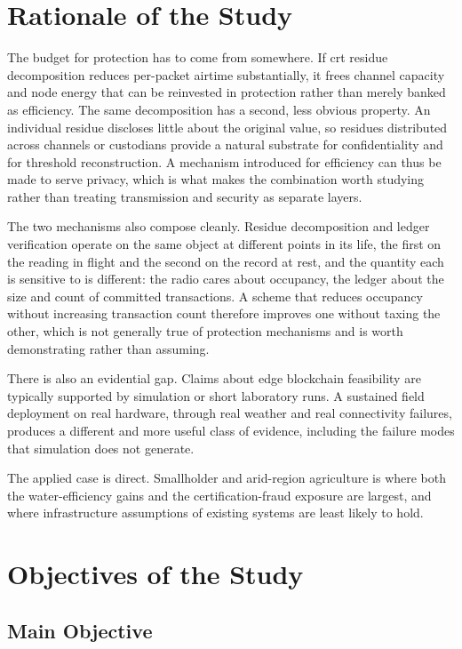 \documentclass[12pt,a4paper,oneside]{book}
\begin{document}
\section{Rationale of the Study}
\label{sec:rationale}

The budget for protection has to come from somewhere. If
\gls{crt} residue decomposition reduces per-packet airtime substantially, it
frees channel capacity and node energy that can be reinvested in protection
rather than merely banked as efficiency. The same decomposition has a second,
less obvious property. An individual residue discloses little about the original
value, so residues distributed across channels or custodians provide a natural
substrate for confidentiality and for threshold reconstruction. A mechanism
introduced for efficiency can thus be made to serve privacy, which is what makes
the combination worth studying rather than treating transmission and security as
separate layers.

The two mechanisms also compose cleanly. Residue
decomposition and ledger verification operate on the same object at different
points in its life, the first on the reading in flight and the second on the
record at rest, and the quantity each is sensitive to is different: the radio
cares about occupancy, the ledger about the size and count of committed
transactions. A scheme that reduces occupancy without increasing transaction
count therefore improves one without taxing the other, which is not generally
true of protection mechanisms and is worth demonstrating rather than assuming.

There is also an evidential gap. Claims about edge blockchain feasibility are
typically supported by simulation or short laboratory runs. A
sustained field deployment on real hardware, through real weather and real
connectivity failures, produces a different and more useful class of evidence,
including the failure modes that simulation does not generate.

The applied case is direct. Smallholder and arid-region agriculture is where
both the water-efficiency gains and the certification-fraud exposure are
largest, and where infrastructure assumptions of existing systems are least
likely to hold.

\section{Objectives of the Study}
\label{sec:objectives}

\subsection{Main Objective}
\label{subsec:main_objective}
\end{document}
